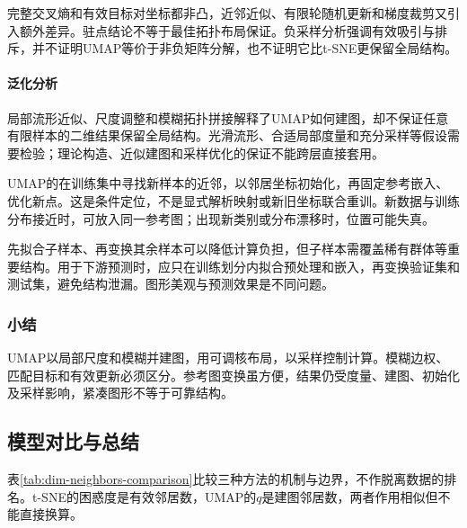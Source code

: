 完整交叉熵和有效目标对坐标都非凸，近邻近似、有限轮随机更新和梯度裁剪又引入额外差异。驻点结论不等于最佳拓扑布局保证。负采样分析强调有效吸引与排斥，并不证明UMAP等价于非负矩阵分解，也不证明它比t-SNE更保留全局结构。

\paragraph{泛化分析}

局部流形近似、尺度调整和模糊拓扑拼接解释了UMAP如何建图，却不保证任意有限样本的二维结果保留全局结构。光滑流形、合适局部度量和充分采样等假设需要检验；理论构造、近似建图和采样优化的保证不能跨层直接套用。

UMAP的在训练集中寻找新样本的近邻，以邻居坐标初始化，再固定参考嵌入、优化新点。这是条件定位，不是显式解析映射或新旧坐标联合重训。新数据与训练分布接近时，可放入同一参考图；出现新类别或分布漂移时，位置可能失真。

先拟合子样本、再变换其余样本可以降低计算负担，但子样本需覆盖稀有群体等重要结构。用于下游预测时，应只在训练划分内拟合预处理和嵌入，再变换验证集和测试集，避免结构泄漏。图形美观与预测效果是不同问题。

\subsubsection{小结}

UMAP以局部尺度和模糊并建图，用可调核布局，以采样控制计算。模糊边权、匹配目标和有效更新必须区分。参考图变换虽方便，结果仍受度量、建图、初始化及采样影响，紧凑图形不等于可靠结构。

\subsection{模型对比与总结}
\label{sec:dim-neighbors-comparison}

表\ref{tab:dim-neighbors-comparison}比较三种方法的机制与边界，不作脱离数据的排名。t-SNE的困惑度是有效邻居数，UMAP的$q$是建图邻居数，两者作用相似但不能直接换算。


